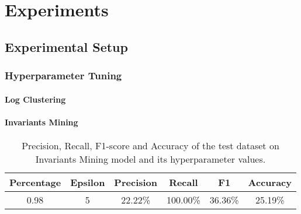 \chapter{Experiments}

\section{Experimental Setup}

\subsection{Hyperparameter Tuning}
\label{appendix:hyperparameterTuning}
\subsubsection{Log Clustering}
\begin{table}[h]
\centering
{}
    \caption{Precision, Recall, F1-score and Accuracy of the test dataset on Log Clustering model with different hyperparameter values.}
    \label{tab:pca_tuning}
\end{table}

\subsubsection{Invariants Mining}

\begin{table}[h]
\centering
\begin{tabular}{@{}cccccc@{}}
\toprule
Percentage & Epsilon & \textbf{Precision} & \textbf{Recall} & \textbf{F1} & \textbf{Accuracy} \\ \midrule
0.98       & 5       & 22.22\%               & 100.00\%               & 36.36\%      & 25.19\%            
\end{tabular}
    \caption{Precision, Recall, F1-score and Accuracy of the test dataset on Invariants Mining model and its hyperparameter values.}
    \label{tab:pca_tuning}
\end{table}

